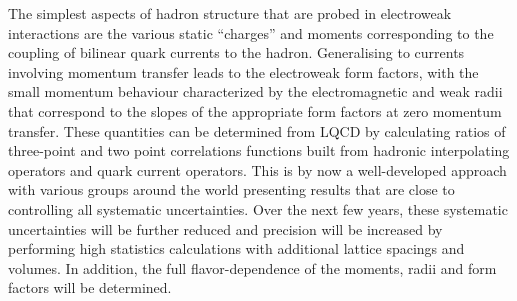 The simplest aspects of hadron structure that are probed in electroweak interactions are the various static ``charges'' and moments corresponding to the coupling of bilinear quark currents to the hadron. Generalising to currents involving momentum transfer leads to the  electroweak form factors, with the small momentum behaviour characterized by the electromagnetic and weak radii that correspond to the slopes of the appropriate form factors at zero momentum transfer. These quantities can be determined from LQCD by calculating ratios of three-point and two point correlations functions built from hadronic interpolating operators and quark current operators. This is by now a well-developed approach with various groups around the world presenting results that are close to controlling all systematic uncertainties. Over the next few years, these systematic uncertainties will be further reduced  and  precision will be increased by performing high statistics calculations with additional lattice spacings and volumes. In addition, the full flavor-dependence of the moments, radii and form factors will be determined. 

